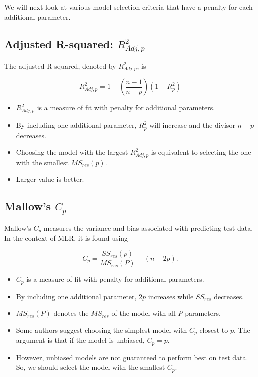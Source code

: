 \documentclass[
]{book}
\providecommand{\tightlist}{%
  \setlength{\itemsep}{0pt}\setlength{\parskip}{0pt}}
\begin{document}
We will next look at various model selection criteria that have a penalty for each additional parameter.

\hypertarget{adjusted-r-squared-r_adjp2}{%
\subsection{\texorpdfstring{Adjusted R-squared: \(R_{Adj,p}^{2}\)}{Adjusted R-squared: R\_\{Adj,p\}\^{}\{2\}}}\label{adjusted-r-squared-r_adjp2}}

The adjusted R-squared, denoted by \(R_{Adj,p}^{2}\), is

\begin{equation} 
R_{Adj,p}^{2} = 1 - \left( \frac{n-1}{n-p} \right) (1 - R^2_{p})
\label{eq:9aR2}
\end{equation}

\begin{itemize}
\tightlist
\item
  \(R_{Adj,p}^{2}\) is a measure of fit with penalty for additional parameters.
\item
  By including one additional parameter, \(R^2_{p}\) will increase and the divisor \(n-p\) decreases.
\item
  Choosing the model with the largest \(R_{Adj,p}^{2}\) is equivalent to selecting the one with the smallest \(MS_{res}(p)\).
\item
  Larger value is better.
\end{itemize}

\hypertarget{mallows-c_p}{%
\subsection{\texorpdfstring{Mallow's \(C_p\)}{Mallow's C\_p}}\label{mallows-c_p}}

Mallow's \(C_p\) measures the variance and bias associated with predicting test data. In the context of MLR, it is found using

\begin{equation} 
C_p = \frac{SS_{res}(p)}{MS_{res}(P)} - (n-2p).
\label{eq:9cp}
\end{equation}

\begin{itemize}
\tightlist
\item
  \(C_p\) is a measure of fit with penalty for additional parameters.
\item
  By including one additional parameter, \(2p\) increases while \(SS_{res}\) decreases.
\item
  \(MS_{res}(P)\) denotes the \(MS_{res}\) of the model with all \(P\) parameters.
\item
  Some authors suggest choosing the simplest model with \(C_p\) closest to \(p\). The argument is that if the model is unbiased, \(C_p = p\).
\item
  However, unbiased models are not guaranteed to perform best on test data. So, we should select the model with the smallest \(C_p\).
\end{itemize}
\end{document}
